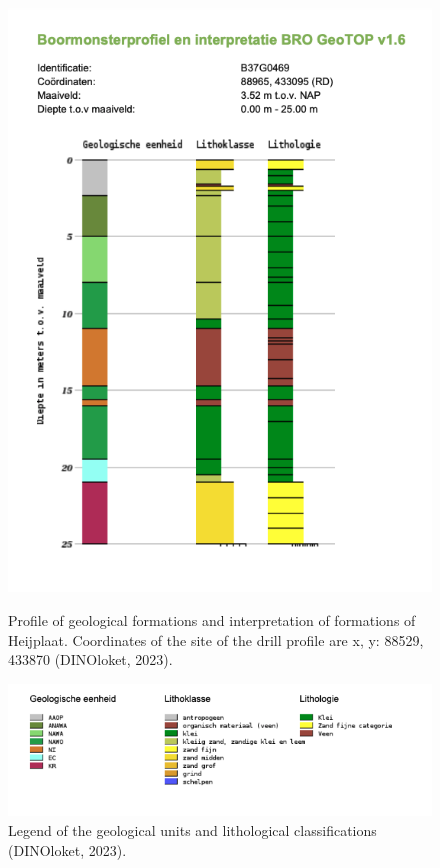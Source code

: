 \newpage
\begin{figure}[htbp]
    \centering
    \begin{minipage}{0.45\linewidth}
        \includegraphics[width=\linewidth]{figures/heij/drillsite.png}
        \caption{Profile of geological formations and interpretation of formations of Heijplaat. Coordinates of the site of the drill profile are x, y: 88529, 433870 (DINOloket, 2023).}
    \end{minipage}
    \hfill
    \begin{minipage}{0.50\linewidth}
        \includegraphics[width=\linewidth]{figures/heij/litho.png}
        \caption{Legend of the geological units and lithological classifications (DINOloket, 2023).}
    \end{minipage}
\end{figure}

